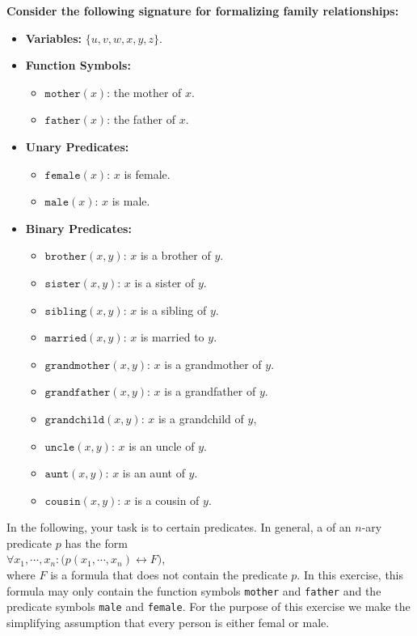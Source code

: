 \exerciseEng
\noindent \textbf{Consider the following signature for formalizing family relationships:}
\begin{itemize}
    \item \textbf{Variables:} $\{ u, v, w, x, y, z \}$.
    \item \textbf{Function Symbols:}
    \begin{itemize}
        \item $\texttt{mother}(x)$: the mother of $x$.
        \item $\texttt{father}(x)$: the father of $x$.
    \end{itemize}
    \item \textbf{Unary Predicates:}
    \begin{itemize}
        \item $\texttt{female}(x)$: $x$ is female.
        \item $\texttt{male}(x)$: $x$ is male.
    \end{itemize}
    \item \textbf{Binary Predicates:}
    \begin{itemize}
    \item $\texttt{brother}(x,y)$: $x$ is a brother of $y$.
    \item $\texttt{sister}(x,y)$: $x$ is a sister of $y$.
    \item $\texttt{sibling}(x,y)$: $x$ is a sibling of $y$.
    \item $\texttt{married}(x,y)$: $x$ is married to $y$.
    \item $\texttt{grandmother}(x,y)$: $x$ is a grandmother of $y$.
    \item $\texttt{grandfather}(x,y)$: $x$ is a grandfather of $y$.
    \item $\texttt{grandchild}(x, y)$: $x$ is a grandchild of $y$,
    \item $\texttt{uncle}(x,y)$: $x$ is an uncle of $y$.
    \item $\texttt{aunt}(x,y)$: $x$ is an aunt of $y$.
    \item $\texttt{cousin}(x,y)$: $x$ is a cousin of $y$.
    \end{itemize}
\end{itemize}
In the following, your task is to  certain predicates. In general, a  of an
$n$-ary predicate $p$ has the form 
\\[0.2cm]
\hspace*{1.3cm}
$\forall x_1, \cdots, x_n: \bigl(p(x_1,\cdots,x_n) \leftrightarrow F\bigr)$,
\\[0.2cm]
where $F$ is a formula that does not contain the predicate $p$.  In this exercise, this formula
may only contain the function symbols \texttt{mother} and \texttt{father} and the predicate symbols \texttt{male} and
\texttt{female}.  For the purpose of this exercise we make the simplifying assumption that
every person is either femal or male.

